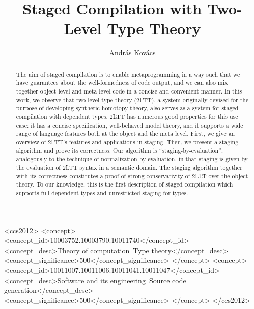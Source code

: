 \documentclass[acmsmall,screen]{acmart}
\theoremstyle{remark}
\begin{document}
\title{Staged Compilation with Two-Level Type Theory}

\author{András Kovács}

\begin{abstract}
The aim of staged compilation is to enable metaprogramming in a way such that we
have guarantees about the well-formedness of code output, and we can also mix
together object-level and meta-level code in a concise and convenient manner. In
this work, we observe that two-level type theory (2LTT), a system originally
devised for the purpose of developing synthetic homotopy theory, also serves as
a system for staged compilation with dependent types. 2LTT has numerous good
properties for this use case: it has a concise specification, well-behaved model
theory, and it supports a wide range of language features both at the object and
the meta level. First, we give an overview of 2LTT's features and applications
in staging. Then, we present a staging algorithm and prove its correctness. Our
algorithm is ``staging-by-evaluation'', analogously to the technique of
normalization-by-evaluation, in that staging is given by the evaluation of 2LTT
syntax in a semantic domain. The staging algorithm together with its correctness
constitutes a proof of strong conservativity of 2LLT over the object theory. To our
knowledge, this is the first description of staged compilation which supports
full dependent types and unrestricted staging for types.
\end{abstract}

\begin{CCSXML}
<ccs2012>
   <concept>
       <concept_id>10003752.10003790.10011740</concept_id>
       <concept_desc>Theory of computation~Type theory</concept_desc>
       <concept_significance>500</concept_significance>
       </concept>
   <concept>
       <concept_id>10011007.10011006.10011041.10011047</concept_id>
       <concept_desc>Software and its engineering~Source code generation</concept_desc>
       <concept_significance>500</concept_significance>
       </concept>
 </ccs2012>
\end{CCSXML}
\end{document}
